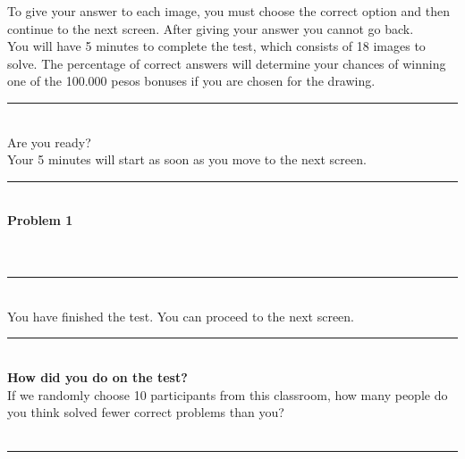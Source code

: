 \documentclass[11pt,a4paper,oneside]{article}
\begin{document}
\noindent To give your answer to each image, you must choose the correct option and then continue to the next screen. After giving your answer you cannot go back. \\

\noindent You will have 5 minutes to complete the test, which consists of 18 images to solve. The percentage of correct answers will determine your chances of winning one of the 100.000 pesos bonuses if you are chosen for the drawing. \\

\noindent\rule{\textwidth}{0.4pt}\\

\noindent Are you ready? \\
 
\noindent Your 5 minutes will start as soon as you move to the next screen. \\

\noindent\rule{\textwidth}{0.4pt}\\

\noindent \textbf{Problem 1}\\

 \\

 \\

\noindent\rule{\textwidth}{0.4pt}\\

\noindent You have finished the test. You can proceed to the next screen. \\

\noindent\rule{\textwidth}{0.4pt}\\

\noindent \textbf{How did you do on the test?} \\

\noindent If we randomly choose 10 participants from this classroom, how many people do you think solved fewer correct problems than you?\\

\\

\noindent\rule{\textwidth}{0.4pt}\\
\end{document}
